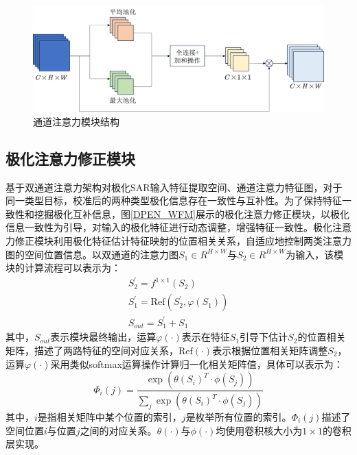 \begin{figure}[ht!]
    \centering
    \includegraphics[width=14cm]{pic/chapter3/Channel.png}
    \caption{通道注意力模块结构}
    \label{fig:channel}
\end{figure}

\subsection{极化注意力修正模块}
\label{sec:极化注意力修正模块}

基于双通道注意力架构对极化SAR输入特征提取空间、通道注意力特征图，对于同一类型目标，校准后的两种类型极化信息存在一致性与互补性。为了保持特征一致性和挖掘极化互补信息，图\ref{DPEN_WFM}展示的极化注意力修正模块，以极化信息一致性为引导，对输入的极化特征进行动态调整，增强特征一致性。极化注意力修正模块利用极化特征估计特征映射的位置相关关系，自适应地控制两类注意力图的空间位置信息。以双通道的注意力图$S_1\in R^{H \times W}$与$S_2\in R^{H \times W}$为输入，该模块的计算流程可以表示为：
\begin{gather}
    S_{2}^{\prime}=f^{1\times 1}\left( S_2 \right)
    \\
    S_{1}^{\prime}=\mathrm{Ref}\left( S_{2}^{\prime},\varphi \left( S_1 \right) \right)
    \\
    S_{out}=S_{1}^{\prime}+S_1
\end{gather}
其中，$S_{out}$表示模块最终输出，运算$\varphi(\cdot)$表示在特征$S_1$引导下估计$S_2$的位置相关矩阵，描述了两路特征的空间对应关系，$\mathrm{Ref}(\cdot)$表示根据位置相关矩阵调整$S_{2}$，运算$\varphi(\cdot)$采用类似softmax运算操作计算归一化相关矩阵值，具体可以表示为：
\begin{equation}
    \Phi _i\left( j \right) =\frac{\exp \left( \theta \left( S_i \right) ^T\cdot \phi \left( S_j \right) \right)}{\sum_j{\exp \left( \theta \left( S_i \right) ^T\cdot \phi \left( S_j \right) \right)}}
\end{equation}
其中，$i$是指相关矩阵中某个位置的索引，$j$是枚举所有位置的索引。$\Phi_i(j)$描述了空间位置$i$与位置$j$之间的对应关系。$\theta(\cdot)$与$\phi(\cdot)$均使用卷积核大小为$1\times 1$的卷积层实现。

